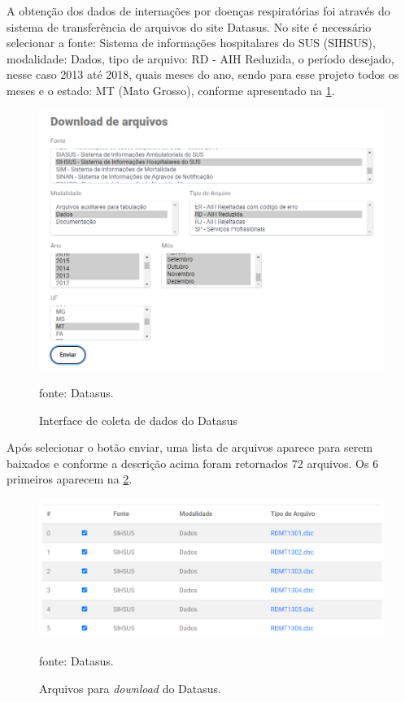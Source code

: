 \documentclass[
  12pt,		%
  a4paper,	%
  openright,%
  oneside,	%
  chapter=TITLE,		%
  section=TITLE,		%
  english,	%
  french,	%
  spanish,	%
  brazil	%
]{abntex2}
\begin{document}
    A obtenção dos dados de internações por doenças respiratórias foi através do sistema de transferência
    de arquivos do site Datasus. No site é necessário selecionar a fonte: Sistema de informações hospitalares do SUS (SIHSUS),
    modalidade: Dados, tipo de arquivo: RD - AIH Reduzida, o período desejado, nesse caso 2013 até 2018, quais meses do ano, sendo
    para esse projeto todos os meses e o estado: MT (Mato Grosso), conforme apresentado na \ref*{interface_datasus}.

    \begin{figure}[ht]
        \centering
        \caption{Interface de coleta de dados do Datasus}
        \includegraphics[width=12cm]{../reports/figures/interface_datasus.png}
        \label{interface_datasus}
        \par
        {\small fonte: Datasus.}
    \end{figure}

    Após selecionar o botão enviar, uma lista de arquivos aparece para serem baixados e conforme a descrição acima foram
    retornados 72 arquivos. Os 6 primeiros aparecem na \ref*{arquivos_datasus}.

    \begin{figure}[ht]
        \centering
        \caption{Arquivos para \textit{download} do Datasus.}
        \includegraphics[width=12cm]{../reports/figures/arquivos_datasus.png}
        \label{arquivos_datasus}
        \par
        {\small fonte: Datasus.}
    \end{figure}
\end{document}
